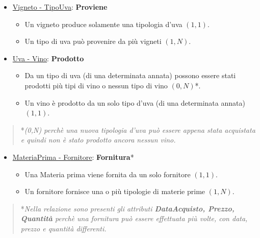 \begin{itemize}
	\item \underline{Vigneto - TipoUva}: \textbf{Proviene}
	
	\begin{itemize}
		\item Un vigneto produce solamente una tipologia d'uva $(1,1)$.
		\item Un tipo di uva può provenire da più vigneti $(1,N)$.
	\end{itemize}
	
\end{itemize}

\begin{itemize}
	\item \underline{Uva - Vino}: \textbf{Prodotto}
	
	\begin{itemize}
		\item Da un tipo di uva (di una determinata annata) possono essere stati prodotti più tipi di vino o nessun tipo di vino $(0,N)$*.
		\item Un vino è prodotto da un solo tipo d'uva (di una determinata annata) $(1,1)$.
	\end{itemize}
	
\end{itemize}

\begin{verse}
	*\emph{(0,N) perchè una nuova tipologia d'uva può essere appena stata acquistata e quindi non è stato prodotto ancora nessun vino.}
\end{verse}


\begin{itemize}
	\item \underline{MateriaPrima - Fornitore}: \textbf{Fornitura}*
	
	\begin{itemize}
		\item Una Materia prima viene fornita da un solo fornitore $(1,1)$.
		\item Un fornitore fornisce una o più tipologie di materie prime $(1,N)$.
	\end{itemize}
	
\end{itemize}

\begin{verse}
*\emph{Nella relazione sono presenti gli attributi \textbf{DataAcquisto, Prezzo, Quantità} perchè una fornitura può essere effettuata più volte, con data, prezzo e quantità differenti.}
\end{verse}


